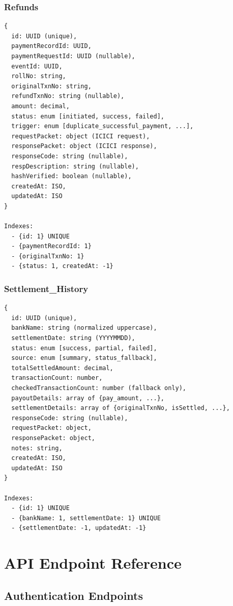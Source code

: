 \documentclass[12pt,a4paper]{article}
\begin{document}
\subsubsection{Refunds}
\begin{lstlisting}
{
  id: UUID (unique),
  paymentRecordId: UUID,
  paymentRequestId: UUID (nullable),
  eventId: UUID,
  rollNo: string,
  originalTxnNo: string,
  refundTxnNo: string (nullable),
  amount: decimal,
  status: enum [initiated, success, failed],
  trigger: enum [duplicate_successful_payment, ...],
  requestPacket: object (ICICI request),
  responsePacket: object (ICICI response),
  responseCode: string (nullable),
  respDescription: string (nullable),
  hashVerified: boolean (nullable),
  createdAt: ISO,
  updatedAt: ISO
}

Indexes:
  - {id: 1} UNIQUE
  - {paymentRecordId: 1}
  - {originalTxnNo: 1}
  - {status: 1, createdAt: -1}
\end{lstlisting}

\subsubsection{Settlement\_History}
\begin{lstlisting}
{
  id: UUID (unique),
  bankName: string (normalized uppercase),
  settlementDate: string (YYYYMMDD),
  status: enum [success, partial, failed],
  source: enum [summary, status_fallback],
  totalSettledAmount: decimal,
  transactionCount: number,
  checkedTransactionCount: number (fallback only),
  payoutDetails: array of {pay_amount, ...},
  settlementDetails: array of {originalTxnNo, isSettled, ...},
  responseCode: string (nullable),
  requestPacket: object,
  responsePacket: object,
  notes: string,
  createdAt: ISO,
  updatedAt: ISO
}

Indexes:
  - {id: 1} UNIQUE
  - {bankName: 1, settlementDate: 1} UNIQUE
  - {settlementDate: -1, updatedAt: -1}
\end{lstlisting}

\section{API Endpoint Reference}

\subsection{Authentication Endpoints}
\end{document}
